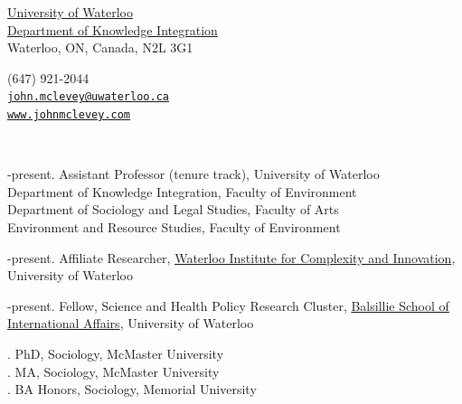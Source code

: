 \documentclass[9pt,usenames,dvipsnames]{article}
\makeatletter
\def\myemail{john.mclevey@uwaterloo.ca}
\def\myweb{www.johnmclevey.com}
\def\myphone{(647) 921-2044}
\makeatother
\begin{document}
\begin{minipage}[t]{2.95in}
 \flushright \footnotesize \href{https://uwaterloo.ca/}{University of Waterloo} \\  \href{https://uwaterloo.ca/knowledge-integration/faculty-mclevey}{Department of Knowledge Integration} \\ Waterloo, ON, Canada, N2L 3G1\\
  \end{minipage}
\hfill     
\hfill
\begin{minipage}[t]{1.7in}
  \flushright \footnotesize \myphone\, \faPhone \\
  {\texttt{\href{mailto:\myemail}{\myemail}} \, \faEnvelope} \\
  {\texttt{\href{\myweb}{\myweb}} \, \faGlobe} \\
\end{minipage}


\bigskip

 \\
\reversemarginpar

\bigskip 
{}
\smallskip 
{}-present. Assistant Professor (tenure track), University of Waterloo \\
\noindent Department of Knowledge Integration, Faculty of Environment \\
\noindent Department of Sociology and Legal Studies, Faculty of Arts \\
\noindent Environment and Resource Studies, Faculty of Environment \\
\smallskip


-present. Affiliate Researcher, \href{http://wici.ca/new/}{Waterloo Institute for Complexity and Innovation}, University of Waterloo

-present. Fellow, Science and Health Policy Research Cluster, \href{http://www.balsillieschool.ca/}{Balsillie School of International Affairs}, University of Waterloo \\

\medskip 
{}

. PhD, Sociology, McMaster University \\
. MA, Sociology, McMaster University \\
. BA Honors, Sociology, Memorial University \\
\end{document}

